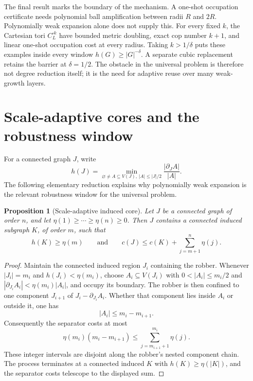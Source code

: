 \documentclass[11pt]{amsart}
\newtheorem{proposition}[theorem]{Proposition}
\theoremstyle{definition}
\newcommand{\cnum}{c}
\begin{document}
The final result marks the boundary of the mechanism.  A one-shot occupation
certificate needs polynomial ball amplification between radii $R$ and $2R$.
Polynomially weak expansion alone does not supply this.  For every fixed
$k$, the Cartesian tori $C_L^{\square k}$ have bounded metric doubling, exact
cop number $k+1$, and linear one-shot occupation cost at every radius.  Taking
$k>1/\delta$ puts these examples inside every window
$h(G)\ge |G|^{-\delta}$.  A separate cubic replacement retains the barrier at
$\delta=1/2$.  The obstacle in the universal problem is therefore not degree
reduction itself; it is the need for adaptive reuse over many weak-growth
layers.

\section{Scale-adaptive cores and the robustness window}

For a connected graph $J$, write
\[
 h(J)=\min_{\varnothing\ne A\subseteq V(J),\ |A|\le |J|/2}
 \frac{|\partial_J A|}{|A|}.
\]
The following elementary reduction explains why polynomially weak expansion
is the relevant robustness window for the universal problem.

\begin{proposition}[Scale-adaptive induced core]\label{prop:adaptive-core}
Let $J$ be a connected graph of order $n$, and let
$\eta(1)\ge\cdots\ge\eta(n)\ge0$.  Then $J$ contains a connected induced
subgraph $K$, of order $m$, such that
\[
 \boxed{h(K)\ge\eta(m)}
 \qquad\text{and}\qquad
 \boxed{\cnum(J)\le \cnum(K)+\sum_{j=m+1}^{n}\eta(j).}
\]
\end{proposition}

\begin{proof}
Maintain the connected induced region $J_i$ containing the robber.  Whenever
$|J_i|=m_i$ and $h(J_i)<\eta(m_i)$, choose
$A_i\subseteq V(J_i)$ with $0<|A_i|\le m_i/2$ and
$|\partial_{J_i}A_i|<\eta(m_i)|A_i|$, and occupy its boundary.  The robber is
then confined to one component $J_{i+1}$ of
$J_i-\partial_{J_i}A_i$.  Whether that component lies inside $A_i$ or outside
it, one has
\[
 |A_i|\le m_i-m_{i+1}.
\]
Consequently the separator costs at most
\[
 \eta(m_i)(m_i-m_{i+1})
 \le
 \sum_{j=m_{i+1}+1}^{m_i}\eta(j).
\]
These integer intervals are disjoint along the robber's nested component
chain.  The process terminates at a connected induced $K$ with
$h(K)\ge\eta(|K|)$, and the separator costs telescope to the displayed sum.
\end{proof}
\end{document}
